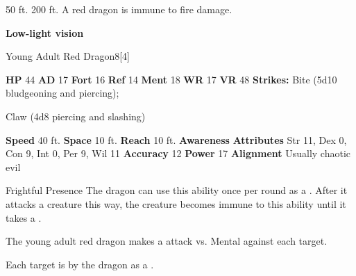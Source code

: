       
       50 ft.
     200 ft.
     A red dragon is immune to fire damage.
    \par\noindent\textbf{Low-light vision}
  

  \begin{monsubsection}{Young Adult Red Dragon}{8}[4]
    \vspace{-1em}\vspace{-1em}
    \vspace{0em}

    
    

    \begin{spellcontent}
      \begin{spelltargetinginfo}
        \pari \textbf{HP} 44 \monsep
          \textbf{AD} 17 \monsep
          \textbf{Fort} 16 \monsep
          \textbf{Ref} 14 \monsep
          \textbf{Ment} 18
        \pari \textbf{WR} 17 \monsep
        \textbf{VR} 48
        \pari \textbf{Strikes:}
            Bite  (5d10 bludgeoning and piercing);
\par Claw  (4d8 piercing and slashing)
      \end{spelltargetinginfo}
    \end{spellcontent}
    \begin{monsterfooter}
      \pari \textbf{Speed} 40 ft. \monsep
        \textbf{Space} 10 ft. \monsep
        \textbf{Reach} 10 ft.
      \pari \textbf{Awareness} 
      \pari \textbf{Attributes}
        Str 11, Dex 0,
        Con 9, Int 0,
        Per 9, Wil 11
      \pari \textbf{Accuracy} 12 \monsep
        \textbf{Power} 17
      \pari \textbf{Alignment} Usually chaotic evil
    \end{monsterfooter}
  \end{monsubsection}
  \begin{freeability}{Frightful Presence}
      The dragon can use this ability once per round as a .
      After it attacks a creature this way, the creature becomes immune to this ability until it takes a .
      \par The young adult red dragon makes a  attack
        vs. Mental against each target.
    
    \hit Each target is  by the dragon as a .
    \end{freeability}
  


